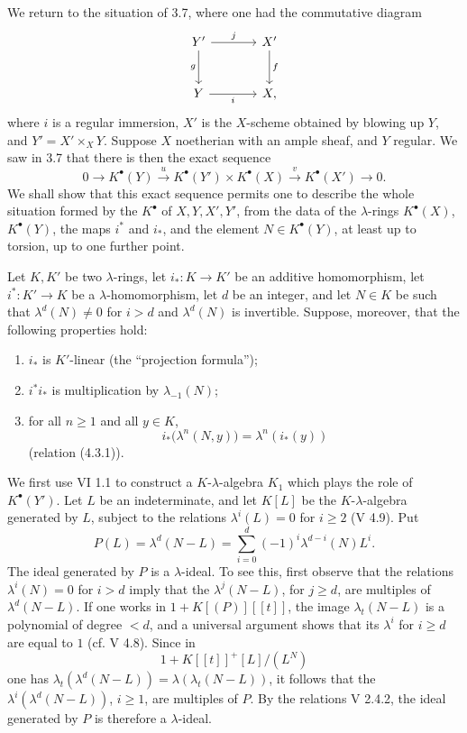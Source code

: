 \documentclass[11pt]{article}
\begin{document}
We return to the situation of 3.7, where one had the commutative diagram
\[
\begin{tikzcd}[column sep=large,row sep=large]
Y' \arrow[r,"j"] \arrow[d,"g"'] & X' \arrow[d,"f"]\\
Y \arrow[r,"i"'] & X,
\end{tikzcd}
\]
where \(i\) is a regular immersion, \(X'\) is the \(X\)-scheme obtained by blowing up \(Y\), and \(Y'=X'\times_XY\). Suppose \(X\) noetherian with an ample sheaf, and \(Y\) regular. We saw in 3.7 that there is then the exact sequence
\[
0\longrightarrow K^\bullet(Y)\xrightarrow{u}
K^\bullet(Y')\times K^\bullet(X)\xrightarrow{v}
K^\bullet(X')\longrightarrow0.
\]
We shall show that this exact sequence permits one to describe the whole situation formed by the \(K^\bullet\) of \(X,Y,X',Y'\), from the data of the \(\lambda\)-rings \(K^\bullet(X)\), \(K^\bullet(Y)\), the maps \(i^*\) and \(i_*\), and the element \(N\in K^\bullet(Y)\), at least up to torsion, up to one further point.

Let \(K,K'\) be two \(\lambda\)-rings, let \(i_*:K\to K'\) be an additive homomorphism, let \(i^*:K'\to K\) be a \(\lambda\)-homomorphism, let \(d\) be an integer, and let \(N\in K\) be such that \(\lambda^d(N)\ne0\) for \(i>d\) and \(\lambda^d(N)\) is invertible. Suppose, moreover, that the following properties hold:
\begin{enumerate}[label=\roman*)]
\item \(i_*\) is \(K'\)-linear (the ``projection formula'');
\item \(i^*i_*\) is multiplication by \(\lambda_{-1}(N)\);
\item for all \(n\ge1\) and all \(y\in K\),
\[
 i_*\bigl(\lambda^n(N,y)\bigr)=\lambda^n(i_*(y))
\]
(relation (4.3.1)).
\end{enumerate}

We first use VI 1.1 to construct a \(K\)-\(\lambda\)-algebra \(K_1\) which plays the role of \(K^\bullet(Y')\). Let \(L\) be an indeterminate, and let \(K[L]\) be the \(K\)-\(\lambda\)-algebra generated by \(L\), subject to the relations \(\lambda^i(L)=0\) for \(i\ge2\) (V 4.9). Put
\[
  P(L)=\lambda^d(N-L)=\sum_{i=0}^{d}(-1)^i\lambda^{d-i}(N)L^i.
\]
The ideal generated by \(P\) is a \(\lambda\)-ideal. To see this, first observe that the relations \(\lambda^i(N)=0\) for \(i>d\) imply that the \(\lambda^j(N-L)\), for \(j\ge d\), are multiples of \(\lambda^d(N-L)\). If one works in \(1+K[(P)][[t]]\), the image \(\lambda_t(N-L)\) is a polynomial of degree \(<d\), and a universal argument shows that its \(\lambda^i\) for \(i\ge d\) are equal to \(1\) (cf. V 4.8). Since in
\[
1+K[[t]]^+[L]/(L^N)
\]
one has \(\lambda_t(\lambda^d(N-L))=\lambda(\lambda_t(N-L))\), it follows that the \(\lambda^i(\lambda^d(N-L))\), \(i\ge1\), are multiples of \(P\). By the relations V 2.4.2, the ideal generated by \(P\) is therefore a \(\lambda\)-ideal.
\end{document}
